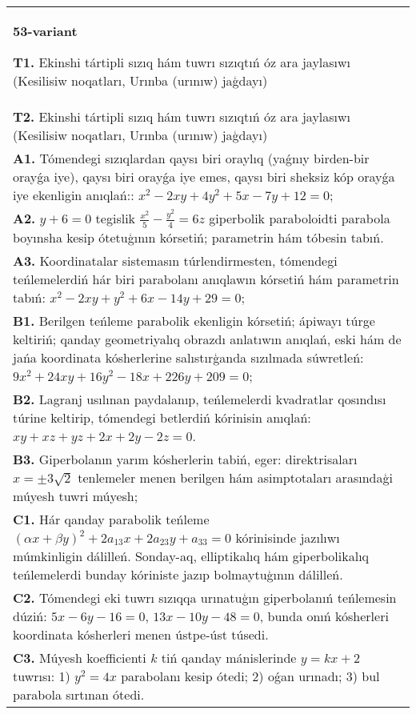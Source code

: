 \documentclass{article}
\begin{document}
\begin{tabular}{m{17cm}}
\textbf{53-variant}
\newline

\textbf{T1.} Ekinshi tártipli sızıq hám tuwrı sızıqtıń óz ara jaylasıwı (Kesilisiw noqatları, Urınba (urınıw) jaģdayı) \\
\textbf{T2.} Ekinshi tártipli sızıq hám tuwrı sızıqtıń óz ara jaylasıwı (Kesilisiw noqatları, Urınba (urınıw) jaģdayı) \\
\textbf{A1.} Tómendegi sızıqlardan qaysı biri oraylıq (yaǵnıy birden-bir orayǵa iye), qaysı biri orayǵa iye emes, qaysı biri sheksiz kóp orayǵa iye ekenligin anıqlań:: $x^2-2 x y+4 y^2+5 x-7 y+12=0$; \\
\textbf{A2.} $y+6=0$ tegislik $\frac{x^2}{5}-\frac{y^2}{4}=6 z$ giperbolik paraboloidti parabola boyınsha kesip ótetuģının kórsetiń; parametrin hám tóbesin tabıń. \\
\textbf{A3.} Koordinatalar sistemasın túrlendirmesten, tómendegi teńlemelerdiń hár biri parabolanı anıqlawın kórsetiń hám parametrin tabıń: $x^2-2 x y+y^2+6 x-14 y+29=0$; \\
\textbf{B1.} Berilgen teńleme parabolik ekenligin kórsetiń; ápiwayı túrge keltiriń; qanday geometriyalıq obrazdı anlatıwın anıqlań, eski hám de jańa koordinata kósherlerine salıstırģanda sızılmada súwretleń: $9 x^2+24 x y+16 y^2-18 x+226 y+209=0$; \\
\textbf{B2.} Lagranj usılınan paydalanıp, teńlemelerdi kvadratlar qosındısı túrine keltirip, tómendegi betlerdiń kórinisin anıqlań: $x y+x z+y z+2 x+2 y-2 z=0$. \\
\textbf{B3.} Giperbolanın yarım kósherlerin tabiń, eger: direktrisaları $x= \pm 3 \sqrt{2}$ tenlemeler menen berilgen hám asimptotaları arasındaģi múyesh tuwri múyesh; \\
\textbf{C1.} Hár qanday parabolik teńleme $ (\alpha x+\beta y) ^2+2a_{13}x+2a_{23}y+a_{33}=0$ kórinisinde jazılıwı múmkinligin dálilleń. Sonday-aq, elliptikalıq hám giperbolikalıq teńlemelerdi bunday kóriniste jazıp bolmaytuģının dálilleń. \\
\textbf{C2.} Tómendegi eki tuwrı sızıqqa urınatuģın giperbolanıń teńlemesin dúziń: $5x-6y-16=0$, $13x-10y-48=0$, bunda onıń kósherleri koordinata kósherleri menen ústpe-úst túsedi. \\
\textbf{C3.} Múyesh koefficienti $k$ tiń qanday mánislerinde $y=kx+2$ tuwrısı: 1) $y^2=4x$ parabolanı kesip ótedi; 2) oǵan urınadı; 3) bul parabola sırtınan ótedi. \\

\end{tabular}
\vspace{1cm}
\end{document}
